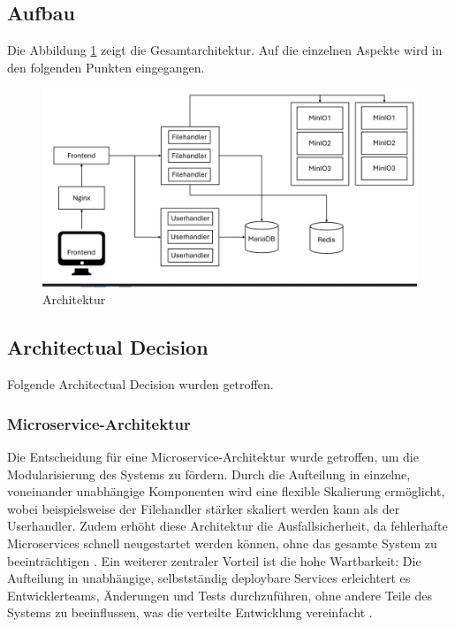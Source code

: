 \documentclass[12pt]{report}
\begin{document}
		\subsection{Aufbau}
			Die Abbildung \ref{fig:architektur} zeigt die Gesamtarchitektur. Auf die einzelnen Aspekte wird in den folgenden Punkten eingegangen.
			\begin{figure}[h]
				\centering
				\includegraphics[width=\linewidth]{architektur}
				\caption{Architektur}
				\label{fig:architektur}
			\end{figure}
			
		\subsection{Architectual Decision}
			Folgende Architectual Decision wurden getroffen.
			
			\subsubsection{Microservice-Architektur}
			Die Entscheidung für eine Microservice-Architektur wurde getroffen, um die Modularisierung des Systems zu fördern. Durch die Aufteilung in einzelne, voneinander unabhängige Komponenten wird eine flexible Skalierung ermöglicht, wobei beispielsweise der Filehandler stärker skaliert werden kann als der Userhandler. Zudem erhöht diese Architektur die Ausfallsicherheit, da fehlerhafte Microservices schnell neugestartet werden können, ohne das gesamte System zu beeinträchtigen \cite{taibi2017processes}. Ein weiterer zentraler Vorteil ist die hohe Wartbarkeit: Die Aufteilung in unabhängige, selbstständig deploybare Services erleichtert es Entwicklerteams, Änderungen und Tests durchzuführen, ohne andere Teile des Systems zu beeinflussen, was die verteilte Entwicklung vereinfacht \cite{de2019monolithic}.
			
\end{document}
